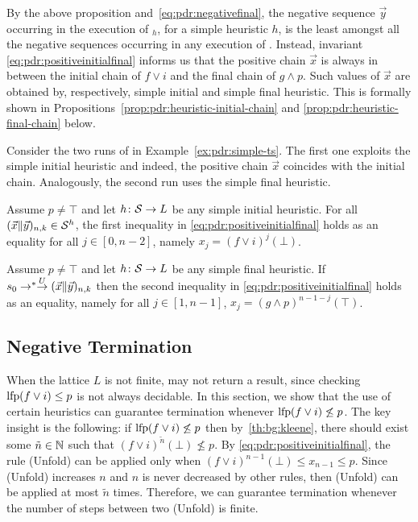 By the above proposition and~\eqref{eq:pdr:negativefinal}, the negative sequence $\vec{y}$ occurring in the execution of {\APDR}$_h$, for a simple heuristic $h$, is the least amongst all the negative sequences occurring in any execution of {\APDR}.
Instead, invariant \eqref{eq:pdr:positiveinitialfinal} informs us that the positive chain $\vec{x}$ is always in between the initial chain of $f\lor i$ and the final chain of $g \land p$. Such values of $\vec{x}$ are obtained by, respectively, simple initial and simple final heuristic.
This is formally shown in Propositions~\ref{prop:pdr:heuristic-initial-chain} and \ref{prop:pdr:heuristic-final-chain} below.

\begin{example}
	Consider the two runs of {\APDR} in Example~\ref{ex:pdr:simple-ts}. The first one exploits the simple initial heuristic and indeed, the positive chain $\vec{x}$ coincides with the initial chain.
	Analogously, the second run uses the simple final heuristic.
\end{example}

\begin{prop}\label{prop:pdr:heuristic-initial-chain}
	Assume $p \neq \top$ and let $h\colon \mathcal{S} \to L$ be any simple initial heuristic.  For all $( \vec{x} \| \vec{y} )_{n,k} \in \mathcal{S}^h$, the first inequality in \eqref{eq:pdr:positiveinitialfinal} holds as an equality for all $j\in[0,n-2]$, namely $x_j=(f\lor i)^{j}(\bot)$.
\end{prop}

\begin{prop}\label{prop:pdr:heuristic-final-chain}
	Assume $p \neq \top$ and let $h\colon \mathcal{S} \to L$ be any simple final heuristic. If $s_0\stackrel{}{\to^*}\stackrel{U}{\to} ( \vec{x} \| \vec{y} )_{n,k}$ then the second inequality in \eqref{eq:pdr:positiveinitialfinal} holds as an equality, namely for all $j\in[1,n-1]$, $x_j=(g\land p)^{n-1-j}(\top)$.
\end{prop}

\subsection{Negative Termination}\label{sec:pdr:termination}
When the lattice $L$ is not finite, {\APDR} may not return a result, since checking $\text{lfp}(f \lor i) \le p$ is not always decidable. In this section, we show that the use of certain heuristics can guarantee termination whenever $\text{lfp}(f \lor i) \not\le p$.
The key insight is the following: if $\text{lfp} (f \lor i) \not \le p$ then by~\eqref{th:bg:kleene}, there should exist some $\tilde{n} \in \mathbb{N}$ such that $(f \lor i)^{\tilde{n}} (\bot) \not \le p$. By \eqref{eq:pdr:positiveinitialfinal}, the rule (Unfold) can be applied only when $(f \lor i)^{n-1} (\bot) \le x_{n-1} \le p$. Since (Unfold) increases $n$ and $n$ is never decreased by other rules, then (Unfold) can be applied at most $\tilde{n}$ times. Therefore, we can guarantee termination whenever the number of steps between two (Unfold) is finite.

